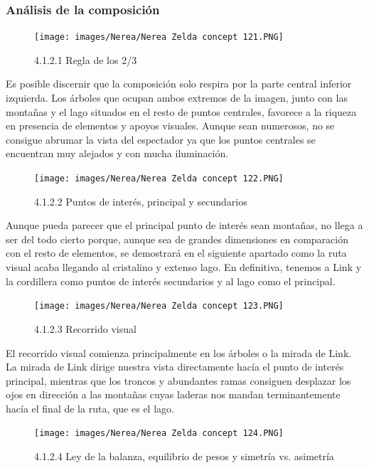 \documentclass[12pt]{article}
\begin{document}
        \subsubsection{Análisis de la composición}

        
    \begin{figure}[H]
      \centering
      \texttt{[image: images/Nerea/Nerea Zelda concept 121.PNG]}
      \caption{\small 4.1.2.1 Regla de los 2/3}
    \end{figure}

    Es posible discernir que la composición solo respira por la parte central inferior izquierda. Los árboles que ocupan ambos extremos de la imagen, junto con las montañas y el lago situados en el resto de puntos centrales, favorece a la riqueza en presencia de elementos y apoyos visuales. Aunque sean numerosos, no se consigue abrumar la vista del espectador ya que los puntos centrales se encuentran muy alejados y con mucha iluminación.

    \begin{figure}[H]
      \centering
      \texttt{[image: images/Nerea/Nerea Zelda concept 122.PNG]}
      \caption{\small 4.1.2.2 Puntos de interés, principal y secundarios}
    \end{figure}

    Aunque pueda parecer que el principal punto de interés sean montañas, no llega a ser del todo cierto porque, aunque sea de grandes dimensiones en comparación con el resto de elementos, se demostrará en el siguiente apartado como la ruta visual acaba llegando al cristalino y extenso lago. En definitiva, tenemos a Link y la cordillera como puntos de interés secundarios y al lago como el principal.

    \begin{figure}[H]
      \centering
      \texttt{[image: images/Nerea/Nerea Zelda concept 123.PNG]}
      \caption{\small 4.1.2.3 Recorrido visual}
    \end{figure}

    El recorrido visual comienza principalmente en los árboles o la mirada de Link. La mirada de Link dirige nuestra vista directamente hacía el punto de interés principal, mientras que los troncos y abundantes ramas consiguen desplazar los ojos en dirección a las montañas cuyas laderas nos mandan terminantemente hacía el final de la ruta, que es el lago.

    \begin{figure}[H]
      \centering
      \texttt{[image: images/Nerea/Nerea Zelda concept 124.PNG]}
      \caption{\small 4.1.2.4 Ley de la balanza, equilibrio de pesos y simetría vs. asimetría}
    \end{figure}
\end{document}

